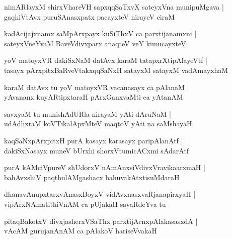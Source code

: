 \begin{shloka}
nimARlayxM shirxVhareVH sapxqqSaTxvX sateyxVna munipuMgava |\\
gaqhiVtAvx puruSAnasxpatx pacayxteV nirayeV ciraM 
\end{shloka}

\begin{shloka}
kadAcijajxnamx saMpArxpayx kuSiThxV ca parxtijanamxni |\\
sateyxVneYvaM BaveVdivxparx anaqteV veY kimucayxteV 
\end{shloka}

\begin{shloka}
yoV matoyxVR dakiSxNaM datAvx karaM  tatapxrXtipAlayeVtf |\\
tasayx pArxpitxBaRveVtakxqqSaNxH satayxM satayxM vadAmayxhaM
\end{shloka}

\begin{shloka}
karaM datAvx tu yoV matoyxVR vacanasayx ca pAlanaM |\\
yAvananx kuyARtipxtaraH pArxGanxvaMti ca yAtanAM 
\end{shloka}

\begin{shloka}
savxyaM tu munishAdURla nirayaM yAti dAruNaM |\\
udAdhxraM koVTikalApxMteV maqtoV yAti na saMshayaH 
\end{shloka}

\begin{shloka}
kaqSaNxpArxpitxH purA kasayx karasayx paripAlanAtf |\\
dakiSxNasayx muneV bUrxhi shorxVtumicACxmi sAdarAtf
\end{shloka}

\begin{shloka}
purA kAMciVpureV shUdorxV nAmAnxsiVdivxVravikaarxmaH |\\
bahAvxshiV paqthulAMgashacx bahuvakAtxtisuMdaraH 
\end{shloka}

\begin{shloka}
dhanavAnupxtarxvAnasxBoyxV vidAvxnasxvaRjanapirxyaH |\\
vipArxNAmatithiVnAM ca pUjakaH savaRdeYva tu
\end{shloka}

\begin{shloka}
pitaqBakotxV divxjasherxVSaThx parxtijAcnxpAlakasasxdA |\\
vAcAM gurujanAnAM ca pAlakoV hariseVvakaH 
\end{shloka}

